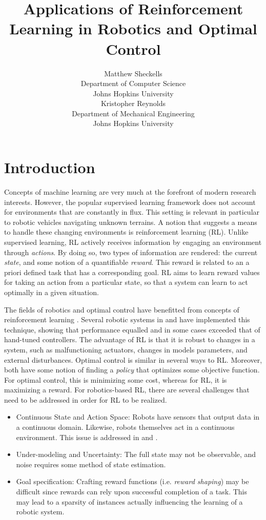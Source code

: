 \documentclass{article} %
\title{Applications of Reinforcement Learning in Robotics and Optimal Control}%
\author{
Matthew Sheckells\\
Department of Computer Science\\
Johns Hopkins University\\
\And
Kristopher Reynolds \\
Department of Mechanical Engineering\\
Johns Hopkins University\\
}
\begin{document}
\maketitle

\section{Introduction}
Concepts of machine learning are very much at the forefront of modern research interests. However, the popular supervised learning framework does not account for environments that are constantly in flux. This setting is relevant in particular to robotic vehicles navigating unknown terrains. A notion that suggests a means to handle these changing environments is reinforcement learning (RL). Unlike supervised learning, RL actively receives information by engaging an environment through \textit{actions}. By doing so, two types of information are rendered: the current \textit{state}, and some notion of a quantifiable \textit{reward}. This reward is related to an a priori defined task that has a corresponding goal. RL aims to learn reward values for taking an action from a particular state, so that a system can learn to act optimally in a given situation.

The fields of robotics and optimal control have benefitted from concepts of reinforcement learning \cite{kober_reinforcement_2013}\cite{kaelbling_reinforcement_1996}. Several robotic systems in  \cite{bhasin_reinforcement_2011} and \cite{hester_rtmba:_2012} have implemented this technique, showing that performance equalled and in some cases exceeded that of hand-tuned controllers. The advantage of RL is that it is robust to changes in a system, such as malfunctioning actuators, changes in models parameters, and external disturbances. Optimal control is similar in several ways to RL. Moreover, both have some notion of finding a \textit{policy} that optimizes some objective function. For optimal control, this is minimizing some cost, whereas for RL, it is maximizing a reward. For robotics-based RL, there are several challenges that need to be addressed in order for RL to be realized.
\begin{itemize}
\item Continuous State and Action Space: Robots have sensors that output data in a continuous domain.  Likewise, robots themselves act in a continuous environment. This issue is addressed in \cite{gaskett_thesis} and \cite{q_learning_navigation}.
\item Under-modeling and Uncertainty: The full state may not be observable, and noise requires some method of state estimation.
\item Goal specification: Crafting reward functions (i.e. \textit{reward shaping}) may be difficult since rewards can rely upon successful completion of a task. This may lead to a sparsity of instances actually influencing the learning of a robotic system.
\end{itemize}
\end{document}
